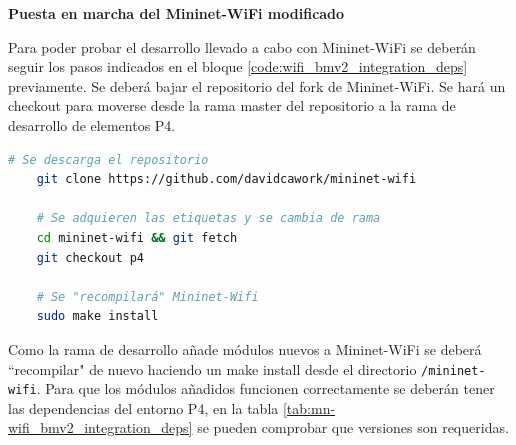\vspace{1cm}
\textbf{Puesta en marcha del Mininet-WiFi modificado}\\
\par
\label{mn_wifi_own_deps}

Para poder probar el desarrollo llevado a cabo con Mininet-WiFi se deberán seguir los pasos indicados en el bloque \ref{code:wifi_bmv2_integration_deps} previamente. Se deberá bajar el repositorio del fork de Mininet-WiFi. Se hará un checkout para moverse desde la rama master del repositorio a la rama de desarrollo de elementos P4.

\begin{lstlisting}[language= bash, style=Consola, caption={Instalación de Mininet-WiFi modificado},label=code:wifi_bmv2_integration_deps]
    # Se descarga el repositorio
    git clone https://github.com/davidcawork/mininet-wifi
    
    # Se adquieren las etiquetas y se cambia de rama
    cd mininet-wifi && git fetch
    git checkout p4
    
    # Se "recompilará" Mininet-Wifi
    sudo make install
\end{lstlisting}
\vspace{0.5cm}

Como la rama de desarrollo añade módulos nuevos a Mininet-WiFi se deberá ``recompilar" de nuevo haciendo un make install desde el directorio \texttt{/mininet-wifi}. Para que los módulos añadidos funcionen correctamente se deberán tener las dependencias del entorno P4, en la tabla \ref{tab:mn-wifi_bmv2_integration_deps} se pueden comprobar que versiones son requeridas.\\
\par

